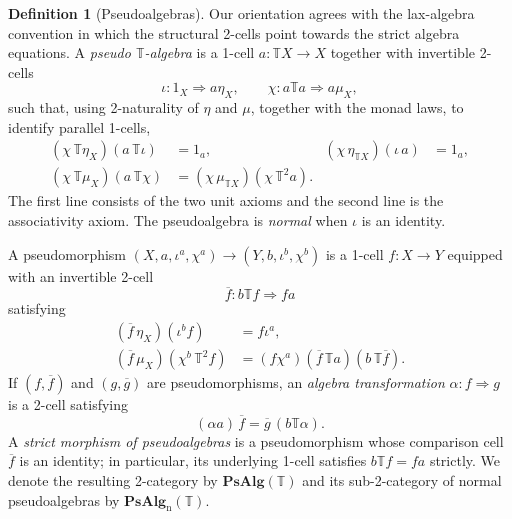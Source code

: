 \documentclass[11pt]{article}
\theoremstyle{plain}
\theoremstyle{definition}
\newtheorem{definition}[theorem]{Definition}
\theoremstyle{remark}
\newcommand{\PsAlg}{\mathbf{PsAlg}}
\numberwithin{equation}{section}
\begin{document}
\begin{definition}[Pseudoalgebras]\label{def:pseudoalgebras}
Our orientation agrees with the lax-algebra
convention in which the structural 2-cells point towards the strict
algebra equations.  A \emph{pseudo $\mathbb T$-algebra} is a 1-cell
$a\colon\mathbb TX\to X$ together with invertible 2-cells
\begin{equation}
  \iota\colon 1_X\Rightarrow a\eta_X,
  \qquad
  \chi\colon a\mathbb T a\Rightarrow a\mu_X,
  \label{eq:pseudoalgebra-cells}
\end{equation}
such that, using 2-naturality of $\eta$ and $\mu$, together with the
monad laws, to identify parallel 1-cells,
\begin{align}
  (\chi\,\mathbb T\eta_X)(a\,\mathbb T\iota)&=1_a,
  &
  (\chi\,\eta_{\mathbb T X})(\iota\,a)&=1_a,
  \label{eq:pseudoalgebra-unit-axioms}\\
  (\chi\,\mathbb T\mu_X)(a\,\mathbb T\chi)
  &=(\chi\,\mu_{\mathbb T X})(\chi\,\mathbb T^2a).
  \label{eq:pseudoalgebra-associativity-axiom}
\end{align}
The first line consists of the two unit axioms and the second line is
the associativity axiom.  The pseudoalgebra is \emph{normal} when
$\iota$ is an identity.

A pseudomorphism
$(X,a,\iota^a,\chi^a)\to(Y,b,\iota^b,\chi^b)$ is a 1-cell
$f\colon X\to Y$ equipped
with an invertible 2-cell
\begin{equation}
  \overline f\colon b\mathbb T f\Rightarrow fa
  \label{eq:pseudomorphism-cell}
\end{equation}
satisfying
\begin{align}
  (\overline f\,\eta_X)(\iota^b f)
  &=f\iota^a,
  \label{eq:pseudomorphism-unit-axiom}\\
  (\overline f\,\mu_X)(\chi^b\,\mathbb T^2f)
  &=(f\chi^a)(\overline f\,\mathbb T a)
    (b\,\mathbb T\overline f).
  \label{eq:pseudomorphism-multiplication-axiom}
\end{align}
If $(f,\overline f)$ and
$(g,\overline g)$ are pseudomorphisms, an \emph{algebra
transformation} $\alpha\colon f\Rightarrow g$ is a 2-cell satisfying
\begin{equation}
  (\alpha a)\,\overline f
  =\overline g\,(b\mathbb T\alpha).
  \label{eq:pseudoalgebra-transformation-general}
\end{equation}
A \emph{strict morphism of pseudoalgebras} is a pseudomorphism whose
comparison cell $\overline f$ is an identity; in particular, its
underlying 1-cell satisfies $b\mathbb T f=fa$ strictly.
We denote the resulting 2-category by
$\PsAlg(\mathbb T)$ and its sub-2-category of normal pseudoalgebras by
$\PsAlg_{\mathrm n}(\mathbb T)$.
\end{definition}
\end{document}
